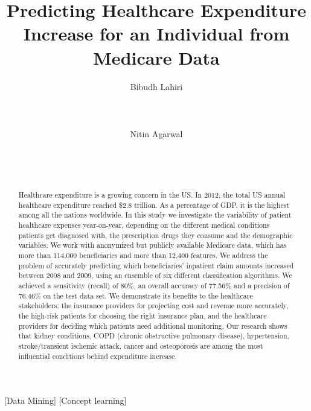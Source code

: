 \documentclass{sig-alternate}
\begin{document}
\title{Predicting Healthcare Expenditure Increase for an Individual from Medicare Data}

\author{
\alignauthor
Bibudh Lahiri\\
       \\
       \\
       \\
\alignauthor
Nitin Agarwal\\
       \\
       \\
       \\
}

\maketitle
\begin{abstract}
Healthcare expenditure is a growing concern in the US. In 2012, the total US annual healthcare expenditure reached \$2.8 trillion. As a percentage of GDP, it is the highest among all the nations worldwide. In this study we investigate the variability of patient healthcare expenses year-on-year, depending on the different medical conditions patients get diagnosed with, the prescription drugs they consume and the demographic variables. We work with anonymized but publicly available Medicare data, which has more than 114,000 beneficiaries and more than 12,400 features. We address the problem of accurately predicting which beneficiaries' inpatient claim amounts increased between 2008 and 2009, using an ensemble of six different classification algorithms. We achieved a sensitivity (recall) of 80\%, an overall accuracy of 77.56\% and a precision of 76.46\% on the test data set. We demonstrate its benefits to the healthcare stakeholders: the insurance providers for projecting cost and revenue more accurately, the high-risk patients for choosing the right insurance plan, and the healthcare providers for deciding which patients need additional monitoring. Our research shows that kidney conditions, COPD (chronic obstructive pulmonary disease), hypertension, stroke/transient ischemic attack, cancer and osteoporosis are among the most influential conditions behind expenditure increase.  
\end{abstract}

[Data Mining]
[Concept learning]











  
\end{document}
